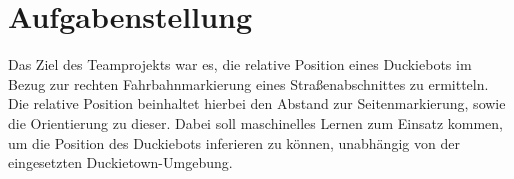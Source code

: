 \section{Aufgabenstellung}

Das Ziel des Teamprojekts war es, die relative Position eines Duckiebots im Bezug zur rechten Fahrbahnmarkierung eines Straßenabschnittes zu ermitteln. Die relative Position beinhaltet hierbei den Abstand zur Seitenmarkierung, sowie die Orientierung zu dieser. Dabei soll maschinelles Lernen zum Einsatz kommen, um die Position des Duckiebots inferieren zu können, unabhängig von der eingesetzten Duckietown-Umgebung. 


